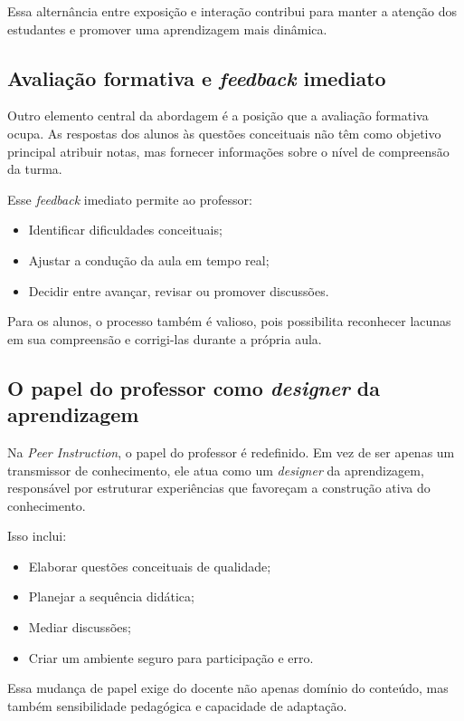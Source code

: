Essa alternância entre exposição e interação contribui para manter a atenção dos estudantes e promover uma aprendizagem mais dinâmica.

\subsection{Avaliação formativa e {\it feedback} imediato}

Outro elemento central da abordagem é a posição que a avaliação formativa ocupa. As respostas dos alunos às questões conceituais não têm como objetivo principal atribuir notas, mas fornecer informações sobre o nível de compreensão da turma.

Esse {\it feedback} imediato permite ao professor:

\begin{itemize}
    \item Identificar dificuldades conceituais;
    \item Ajustar a condução da aula em tempo real;
    \item Decidir entre avançar, revisar ou promover discussões.
\end{itemize}

Para os alunos, o processo também é valioso, pois possibilita reconhecer lacunas em sua compreensão e corrigi-las durante a própria aula.

\subsection{O papel do professor como {\it designer} da aprendizagem}

Na {\it Peer Instruction}, o papel do professor é redefinido. Em vez de ser apenas um transmissor de conhecimento, ele atua como um \textit{designer} da aprendizagem, responsável por estruturar experiências que favoreçam a construção ativa do conhecimento.

Isso inclui:

\begin{itemize}
    \item Elaborar questões conceituais de qualidade;
    \item Planejar a sequência didática;
    \item Mediar discussões;
    \item Criar um ambiente seguro para participação e erro.
\end{itemize}

Essa mudança de papel exige do docente não apenas domínio do conteúdo, mas também sensibilidade pedagógica e capacidade de adaptação.

